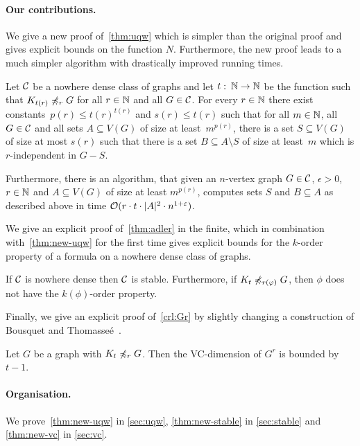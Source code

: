 \paragraph{Our contributions.}

We give a new proof of~\cref{thm:uqw} which is simpler than 
the original proof and gives explicit bounds on the function $N$. 
Furthermore, the new proof leads to a much simpler algorithm 
with drastically improved running times.

\begin{theorem}\label{thm:new-uqw}
  Let $\mathcal{C}$ be a nowhere dense class of graphs and let 
  $t\,\colon\,\mathbb{N}\rightarrow \mathbb{N}$ be the function such that
  $K_{t(r)}\not\preccurlyeq_r G$ for all $r\in \mathbb{N}$ and all $G\in \mathcal{C}$.  
  For every $r\in \mathbb{N}$
  there exist constants~$p(r)\leq t(r)^{t(r)}$ and $s(r)\leq t(r)$ such that
  for all $m\in \mathbb{N}$, all $G\in\mathcal{C}$ and all sets $A\subseteq V(G)$ of size at 
  least~$m^{p(r)}$, there is a set $S\subseteq V(G)$ of size at
  most $s(r)$ such that there is a set $B\subseteq A\setminus S$ of size at
  least~$m$ which is $r$-independent in $G-S$.
  
  Furthermore, there is an algorithm, that given an $n$-vertex graph
  $G\in \mathcal{C}$, $\epsilon>0$, $r\in \mathbb{N}$ and $A\subseteq V(G)$ of size at least
  $m^{p(r)}$, computes sets $S$ and $B\subseteq A$ as described above
  in
  time $\mathcal{O}(r\cdot t\cdot |A|^2\cdot n^{1+\varepsilon})$.
\end{theorem}

We give an explicit proof of~\cref{thm:adler} in the finite, 
which in combination with~\cref{thm:new-uqw} for the first time
gives explicit bounds for the $k$-order property of a formula
on a nowhere dense class of graphs. 

\begin{theorem}\label{thm:new-stable}
If $\mathcal{C}$ is nowhere dense then $\mathcal{C}$ is stable. Furthermore, 
if $K_t\not\preccurlyeq_{r(\varphi)} G$, then $\phi$ does not have
the $k(\phi)$-order property.
\end{theorem}

Finally, we give an explicit proof of~\cref{crl:Gr} by slightly
changing a construction of Bousquet and 
Thomasse\'e~\cite{BousquetT15}. 

\begin{theorem}\label{thm:new-vc}
Let $G$ be a graph with $K_t\not\preccurlyeq_r G$. Then 
the VC-dimension of $G^r$ is
bounded by $t-1$. 
\end{theorem}

\paragraph{Organisation.}
We prove~\cref{thm:new-uqw} in \cref{sec:uqw}, 
\cref{thm:new-stable} in \cref{sec:stable} and
\cref{thm:new-vc} in \cref{sec:vc}. 
